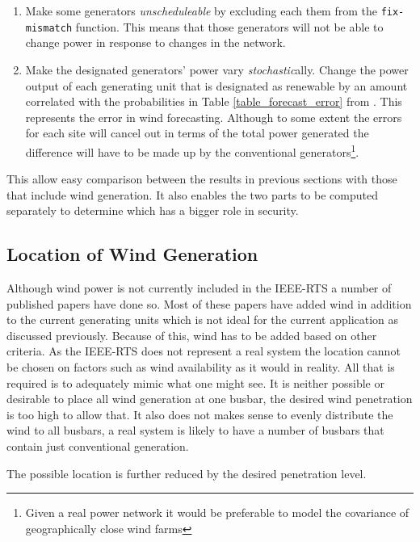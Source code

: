 \documentclass[a4paper,oneside,12pt]{report}
\begin{document}
\begin{enumerate}

\item Make some generators \emph{unscheduleable} by excluding each them from the \texttt{fix-mismatch} function. This means that those generators will not be able to change power in response to changes in the network. 

\item Make the designated generators' power vary \emph{stochastic}ally. Change the power output of each generating unit that is designated as renewable by an amount correlated with the probabilities in Table \ref{table_forecast_error} from \cite{Bathurst2002}. This represents the error in wind forecasting. Although to some extent the errors for each site will cancel out in terms of the total power generated the difference will have to be made up by the conventional generators\footnote{Given a real power network it would be preferable to model the covariance of geographically close wind farms}.

\end{enumerate}

This allow easy comparison between the results in previous sections with those that include wind generation. It also enables the two parts to be computed separately to determine which has a bigger role in security. 

\subsection{Location of Wind Generation}

Although wind power is not currently included in the IEEE-RTS a number of published papers have done so. Most of these papers have added wind in addition to the current generating units which is not ideal for the current application as discussed previously. Because of this, wind has to be added based on other criteria. As the IEEE-RTS does not represent a real system the location cannot be chosen on factors such as wind availability as it would in reality. All that is required is to adequately mimic what one might see. It is neither possible or desirable to place all wind generation at one busbar, the desired wind penetration is too high to allow that. It also does not makes sense to evenly distribute the wind to all busbars, a real system is likely to have a number of busbars that contain just conventional generation.

The possible location is further reduced by the desired penetration level.
\end{document}
